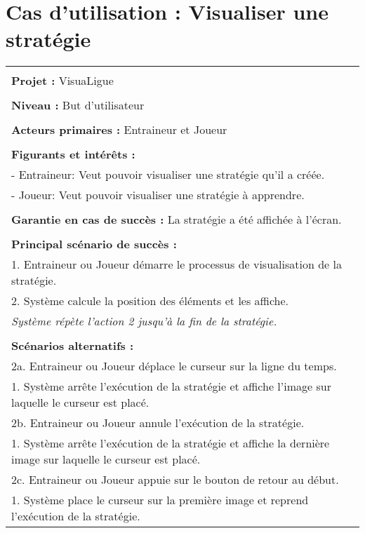 \section{Cas d'utilisation : Visualiser une stratégie}
\begin{longtable}{|p{16cm}|}
	\hline
	\\
	\textbf{Projet :} VisuaLigue\\
	\\
	\textbf{Niveau :} But d'utilisateur\\
	\\
	\textbf{Acteurs primaires :} Entraineur et Joueur\\
	\\
	\textbf{Figurants et intérêts :} \\
	- Entraineur: Veut pouvoir visualiser une stratégie qu'il a créée.\\
	- Joueur: Veut pouvoir visualiser une stratégie à apprendre.\\
	\\
	\textbf{Garantie en cas de succès :} La stratégie a été affichée à l'écran.\\
	\\
	\textbf{Principal scénario de succès :}\\
	1. Entraineur ou Joueur démarre le processus de visualisation de la stratégie.\\
	2. Système calcule la position des éléments et les affiche.\\
	\hspace{1cm} \em Système répète l'action 2 jusqu'à la fin de la stratégie.\\
	\\
	\textbf{Scénarios alternatifs :}\\
	2a. Entraineur ou Joueur déplace le curseur sur la ligne du temps.\\
	\hspace{1cm}1. Système arrête l'exécution de la stratégie et affiche l'image sur laquelle le curseur est placé.\\
	2b. Entraineur ou Joueur annule l'exécution de la stratégie.\\
	\hspace{1cm}1. Système arrête l'exécution de la stratégie et affiche la dernière image sur laquelle le curseur est placé.\\
	2c. Entraineur ou Joueur appuie sur le bouton de retour au début.\\
	\hspace{1cm}1. Système place le curseur sur la première image et reprend l'exécution de la stratégie.\\

\end{longtable}
